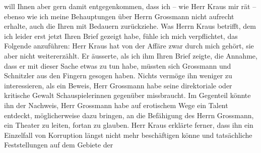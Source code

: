 \begin{ledgroupsized}[t]{13cm}
                    will Ihnen aber gern damit entgegenkommen, dass ich – wie Herr Kraus mir rät – ebenso wie ich meine Behauptungen über
                    Herrn Grossmann nicht aufrecht erhalte, auch
                    die Ihren mit Bedauern zurückziehe.\pend
           \pstart
           Was Herrn Kraus betrifft, dem ich leider erst
                    jetzt Ihren Brief gezeigt habe, fühle ich mich verpflichtet, das Folgende
                    anzuführen: Herr Kraus hat von der Affäre
                    zwar durch mich gehört, sie aber nicht weitererzählt. Er äusserte, als ich ihm
                    Ihren Brief zeigte, die Annahme, dass er mit dieser Sache etwas zu tun habe,
                    müssten sich Grossmann und Schnitzler aus
                    den Fingern gesogen haben. Nichts vermöge ihn weniger zu interessieren, als ein
                    Beweis, Herr Grossmann habe seine
                    direktoriale oder kritische Gewalt Schauspielerinnen gegenüber missbraucht. Im
                    Gegenteil könnte ihn der Nachweis, Herr Grossmann habe auf erotischem Wege ein Talent entdeckt, möglicherweise
                    dazu bringen, an die Befähigung des Herrn Grossmann, ein Theater zu leiten, fortan zu glauben. Herr Kraus erklärte ferner, dass ihn ein
                    Einzelfall von Korruption längst nicht mehr beschäftigen könne und tatsäch{\pb}liche Feststellungen auf dem Gebiete der

\end{ledgroupsized}
